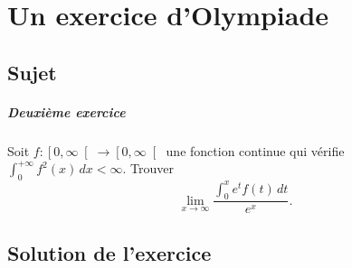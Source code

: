 \chapter{Un exercice d'Olympiade}

\section{Sujet}

\paragraph{Deuxième exercice}

Soit $f : \left[0,\infty\right[ \to \left[0,\infty\right[$ une fonction continue qui vérifie $\int_0^{+\infty} f^2(x)\,dx < \infty$.
Trouver
\[
\lim_{x\to\infty} \frac{\int_0^x e^t f(t)\,dt}{e^x}.
\]

\section{Solution de l'exercice}

